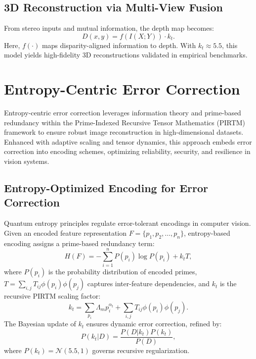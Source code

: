 \documentclass{article}
\theoremstyle{plain}
\begin{document}
\subsection{3D Reconstruction via Multi-View Fusion}
From stereo inputs and mutual information, the depth map becomes:
\begin{equation}
D(x, y) = f(I(X; Y)) \cdot k_t.
\end{equation}
Here, \( f(\cdot) \) maps disparity-aligned information to depth. With \( k_t \approx 5.5 \), this model yields high-fidelity 3D reconstructions validated in empirical benchmarks.

\section{Entropy-Centric Error Correction}
Entropy-centric error correction leverages information theory and prime-based redundancy within the Prime-Indexed Recursive Tensor Mathematics (PIRTM) framework to ensure robust image reconstruction in high-dimensional datasets. Enhanced with adaptive scaling and tensor dynamics, this approach embeds error correction into encoding schemes, optimizing reliability, security, and resilience in vision systems.

\subsection{Entropy-Optimized Encoding for Error Correction}
Quantum entropy principles regulate error-tolerant encodings in computer vision. Given an encoded feature representation \( F = \{p_1, p_2, \dots, p_n\} \), entropy-based encoding assigns a prime-based redundancy term:
\begin{equation}
H(F) = -\sum_{i=1}^{n} P(p_i) \log P(p_i) + k_t T,
\end{equation}
where \( P(p_i) \) is the probability distribution of encoded primes, \( T = \sum_{i,j} T_{ij} \phi(p_i) \phi(p_j) \) captures inter-feature dependencies, and \( k_t \) is the recursive PIRTM scaling factor:
\begin{equation}
k_t = \sum_{p_i} \Lambda_m p_i^{\alpha_t} + \sum_{i,j} T_{ij} \phi(p_i) \phi(p_j).
\end{equation}
The Bayesian update of \( k_t \) ensures dynamic error correction, refined by:
\begin{equation}
P(k_t | D) = \frac{P(D | k_t) P(k_t)}{P(D)},
\end{equation}
where \( P(k_t) = \mathcal{N}(5.5, 1) \) governs recursive regularization.
\end{document}
